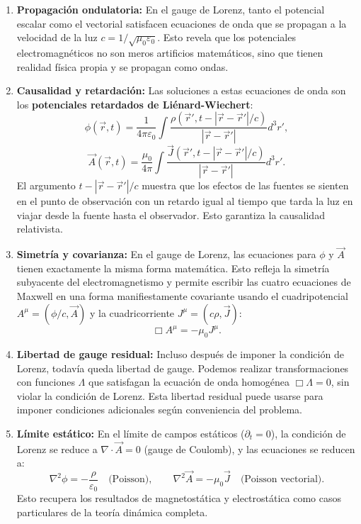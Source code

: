 \documentclass[a4paper]{article}
\begin{document}
\begin{enumerate}
\item \textbf{Propagación ondulatoria:} En el gauge de Lorenz, tanto el potencial escalar como el vectorial satisfacen ecuaciones de onda que se propagan a la velocidad de la luz $c = 1/\sqrt{\mu_0\varepsilon_0}$. Esto revela que los potenciales electromagnéticos no son meros artificios matemáticos, sino que tienen realidad física propia y se propagan como ondas.

\item \textbf{Causalidad y retardación:} Las soluciones a estas ecuaciones de onda son los \textbf{potenciales retardados de Liénard-Wiechert}:
$$
\phi(\vec{r},t) = \frac{1}{4\pi\varepsilon_0} \int \frac{\rho(\vec{r}', t - |\vec{r}-\vec{r}'|/c)}{|\vec{r}-\vec{r}'|} d^3r',
$$
$$
\vec{A}(\vec{r},t) = \frac{\mu_0}{4\pi} \int \frac{\vec{J}(\vec{r}', t - |\vec{r}-\vec{r}'|/c)}{|\vec{r}-\vec{r}'|} d^3r'.
$$
El argumento $t - |\vec{r}-\vec{r}'|/c$ muestra que los efectos de las fuentes se sienten en el punto de observación con un retardo igual al tiempo que tarda la luz en viajar desde la fuente hasta el observador. Esto garantiza la causalidad relativista.

\item \textbf{Simetría y covarianza:} En el gauge de Lorenz, las ecuaciones para $\phi$ y $\vec{A}$ tienen exactamente la misma forma matemática. Esto refleja la simetría subyacente del electromagnetismo y permite escribir las cuatro ecuaciones de Maxwell en una forma manifiestamente covariante usando el cuadripotencial $A^\mu = (\phi/c, \vec{A})$ y la cuadricorriente $J^\mu = (c\rho, \vec{J})$:
$$
\Box A^\mu = -\mu_0 J^\mu.
$$

\item \textbf{Libertad de gauge residual:} Incluso después de imponer la condición de Lorenz, todavía queda libertad de gauge. Podemos realizar transformaciones con funciones $\Lambda$ que satisfagan la ecuación de onda homogénea $\Box \Lambda = 0$, sin violar la condición de Lorenz. Esta libertad residual puede usarse para imponer condiciones adicionales según conveniencia del problema.

\item \textbf{Límite estático:} En el límite de campos estáticos ($\partial_t = 0$), la condición de Lorenz se reduce a $\nabla \cdot \vec{A} = 0$ (gauge de Coulomb), y las ecuaciones se reducen a:
$$
\nabla^2\phi = -\frac{\rho}{\varepsilon_0} \quad \text{(Poisson)}, \qquad \nabla^2\vec{A} = -\mu_0\vec{J} \quad \text{(Poisson vectorial)}.
$$
Esto recupera los resultados de magnetostática y electrostática como casos particulares de la teoría dinámica completa.


\end{enumerate}
\end{document}
